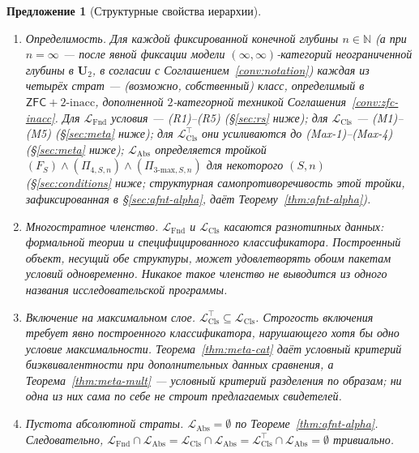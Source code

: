\documentclass[11pt]{article}
\theoremstyle{plain}
\newtheorem{proposition}[theorem]{Предложение}
\theoremstyle{definition}
\newcommand{\LFnd}{\mathcal{L}_{\mathrm{Fnd}}}
\newcommand{\LCls}{\mathcal{L}_{\mathrm{Cls}}}
\newcommand{\LClsMax}{\mathcal{L}_{\mathrm{Cls}}^{\top}}
\newcommand{\LAbs}{\mathcal{L}_{\mathrm{Abs}}}
\newcommand{\ZFC}{\mathsf{ZFC}}
\begin{document}
\begin{proposition}[Структурные свойства иерархии]\label{prop:level-structure}
\begin{enumerate}
\item[\textbf{(i)}] \emph{Определимость.} Для каждой фиксированной конечной глубины $n \in \mathbb{N}$ (а при $n = \infty$ — после явной фиксации модели $(\infty, \infty)$-категорий неограниченной глубины в $\mathbf{U}_2$, в согласии с Соглашением~\ref{conv:notation}) каждая из четырёх страт — (возможно, собственный) класс, определимый в $\ZFC + 2\text{-inacc}$, дополненной $2$-категорной техникой Соглашения~\ref{conv:zfc-inacc}. Для $\LFnd$ условия — (R1)--(R5) (\S\ref{sec:rs} ниже); для $\LCls$ — (M1)--(M5) (\S\ref{sec:meta} ниже); для $\LClsMax$ они усиливаются до (Max-1)--(Max-4) (\S\ref{sec:meta} ниже); $\LAbs$ определяется тройкой $(F_S) \wedge (\Pi_{4, S, n}) \wedge (\Pi_{3\text{-max}, S, n})$ для некоторого $(S, n)$ (\S\ref{sec:conditions} ниже; структурная самопротиворечивость этой тройки, зафиксированная в \S\ref{sec:afnt-alpha}, даёт Теорему~\ref{thm:afnt-alpha}).
\item[\textbf{(ii)}] \emph{Многостратное членство.} $\LFnd$ и $\LCls$ касаются разнотипных данных: формальной теории и специфицированного классификатора. Построенный объект, несущий обе структуры, может удовлетворять обоим пакетам условий одновременно. Никакое такое членство не выводится из одного названия исследовательской программы.
\item[\textbf{(iii)}] \emph{Включение на максимальном слое.} $\LClsMax\subseteq\LCls$. Строгость включения требует явно построенного классификатора, нарушающего хотя бы одно условие максимальности. Теорема~\ref{thm:meta-cat} даёт условный критерий биэквивалентности при дополнительных данных сравнения, а Теорема~\ref{thm:meta-mult} — условный критерий разделения по образам; ни одна из них сама по себе не строит предлагаемых свидетелей.
\item[\textbf{(iv)}] \emph{Пустота абсолютной страты.} $\LAbs = \emptyset$ по Теореме~\ref{thm:afnt-alpha}. Следовательно, $\LFnd \cap \LAbs = \LCls \cap \LAbs = \LClsMax \cap \LAbs = \emptyset$ тривиально.
\end{enumerate}
\end{proposition}
\end{document}
